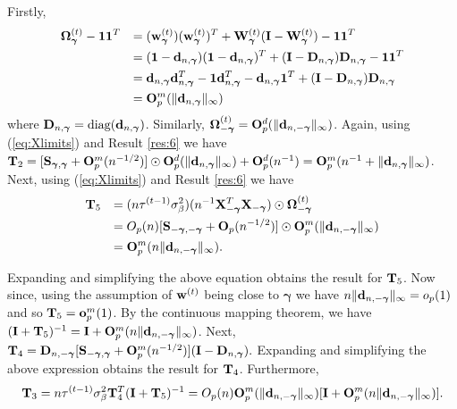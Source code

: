 \documentclass[11pt]{article}
\newtheorem{Main Result}{Main Result}
\def\vectorfontone{\bf}
\def\vectorfonttwo{\boldsymbol}
\def\vd{{\vectorfontone d}}                      %
\def\vu{{\vectorfontone u}}                      %
\def\vw{{\vectorfontone w}}                      %
\def\vone{{\vectorfontone 1}}
\def\vgamma{{\vectorfonttwo \gamma}}             %
\def\matrixfontone{\bf}
\def\matrixfonttwo{\boldsymbol}
\def\mD{{\matrixfontone D}}                      %
\def\mI{{\matrixfontone I}}                      %
\def\mO{{\matrixfontone O}}                      %
\def\mo{{\matrixfontone o}}                      %
\def\mS{{\matrixfontone S}}                      %
\def\mT{{\matrixfontone T}}                      %
\def\mW{{\matrixfontone W}}                      %
\def\mX{{\matrixfontone X}}                      %
\def\mOmega{{\matrixfonttwo \Omega}}             %
\def\ds{\displaystyle}
\newcommand{\cyc}[1]{{\color{black}#1}}
\begin{document}
 Firstly,
$$
\begin{array}{rl}
\ds \mOmega_\vgamma^{(t)} - \vone\vone^T
& \ds = (\vw_{\vgamma}^{(t)})(\vw_{\vgamma}^{(t)})^T + \mW_{\vgamma}^{(t)}(\mI - \mW_{\vgamma}^{(t)}) - \vone\vone^T \\ [1ex]
& \ds = (\vone - \vd_{n,\vgamma})(\vone - \vd_{n,\vgamma})^T + (\mI - \mD_{n,\vgamma})\mD_{n,\vgamma} - \vone\vone^T \\ [1ex]
& \ds = \vd_{n,\vgamma}\vd_{n,\vgamma}^T - \vone\vd_{n,\vgamma}^T  - \vd_{n,\vgamma}\vone^T + (\mI - \mD_{n,\vgamma})\mD_{n,\vgamma} \\ [1ex]
& \ds = \mO_p^m( \|\vd_{n,\vgamma}\|_\infty )
\end{array}
$$
where $\mD_{n,\vgamma}=\mbox{diag}(\vd_{n,\vgamma})$. Similarly, $\mOmega_{-\vgamma}^{(t)}=\mO_p^d(\|\vd_{n,-\vgamma}\|_\infty)$.
Again, using (\ref{eq:Xlimits}) and  Result \ref{res:6} we have
$\mT_2= [\mS_{\vgamma,\vgamma} + \mO_p^m(n^{-1/2})]\odot\mO_p^d( \|\vd_{n,\vgamma}\|_\infty )
+ \mO_p^d(n^{-1})
= \mO_p^m( n^{-1} + \|\vd_{n,\vgamma}\|_\infty )$.
Next, using (\ref{eq:Xlimits}) and Result \ref{res:6} we have
$$
\begin{array}{rl}
\ds \mT_5
& \ds = (n\tau^{\cyc{(t-1)}}\sigma^2_\beta)(n^{-1}\mX_{-\vgamma}^T\mX_{-\vgamma})\odot\mOmega_{-\vgamma}^{(t)}
\\ [1ex]
& \ds
= O_p(n)[\mS_{-\vgamma,-\vgamma} + \mO_p(n^{-1/2})]\odot\mO_p^m(\|\vd_{n,-\vgamma}\|_\infty) \\ [1ex]
& \ds = \mO_p^m(n\|\vd_{n,-\vgamma}\|_\infty).
\end{array}
$$

\noindent Expanding and simplifying the above equation obtains
the result for $\mT_5$. Now since, using the
assumption of $\vw^{(t)}$ being close to $\vgamma$
we have
$n\|\vd_{n,-\vgamma}\|_\infty = o_p(1)$ and so
$\mT_5 = \mo_p^m(1)$. By the continuous mapping theorem, we have
$(\mI + \mT_5)^{-1} = \mI + \mO_p^m(n\|\vd_{n,-\vgamma}\|_\infty)$. Next,
$\mT_4 = \mD_{n,-\vgamma} [\mS_{-\vgamma,\vgamma} + \mO_p^m(n^{-1/2})]
(\mI - \mD_{n,\vgamma}).
$
\noindent Expanding and simplifying the above expression
obtains the result for $\mT_4$. Furthermore,
$$
\ds \mT_3
= n\tau^{\cyc{(t-1)}}\sigma^2_\beta\mT_4^T(\mI + \mT_5)^{-1}
=
O_p(n)\mO_p^m(\|\vd_{n,-\vgamma}\|_\infty)[\mI + \mO_p^m(n\|\vd_{n,-\vgamma}\|_\infty)].
$$
\end{document}
